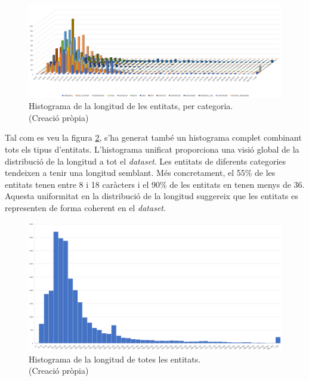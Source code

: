 \begin{figure}[H]
  \centering
  \includegraphics[width=\textwidth]{hist_ent_categoria.png}
  \caption[Histograma de la longitud de les entitats, per categoria]{Histograma de la longitud de les entitats, per categoria. \\ (Creació pròpia)}
  \label{fig:histograma_entitats_tipus}
\end{figure}

Tal com es veu la figura \ref{fig:histograma_entitats_total}, s'ha generat també un histograma complet combinant tots els tipus d'entitats. L'histograma unificat proporciona una visió global de la distribució de la longitud a tot el \textit{dataset}. Les entitats de diferents categories tendeixen a tenir una longitud semblant. Més concretament, el 55\% de les entitats tenen entre 8 i 18 caràcters i el 90\% de les entitats en tenen menys de 36. Aquesta uniformitat en la distribució de la longitud suggereix que les entitats es representen de forma coherent en el \textit{dataset}.

\begin{figure}[H]
  \centering
  \includegraphics[width=\textwidth]{hist_ent_tot.png}
  \caption[Histograma de la longitud de totes les entitats]{Histograma de la longitud de totes les entitats. \\ (Creació pròpia)}
  \label{fig:histograma_entitats_total}
\end{figure}
